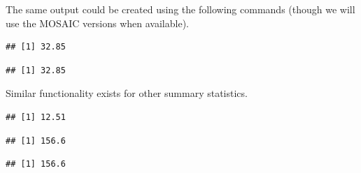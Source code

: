 %
%
The same output could be created using the following commands (though we will use the MOSAIC versions when available).
\begin{knitrout}
\color{fgcolor}\begin{kframe}
\begin{alltt}
 
\end{alltt}
\begin{verbatim}
## [1] 32.85
\end{verbatim}
\begin{alltt}
\hlopt{$}
\end{alltt}
\begin{verbatim}
## [1] 32.85
\end{verbatim}
\end{kframe}
\end{knitrout}
%
%
Similar functionality exists for other summary statistics.
\begin{knitrout}
\color{fgcolor}\begin{kframe}
\begin{alltt}
\hlstd{(}\hlopt{~}  
\end{alltt}
\begin{verbatim}
## [1] 12.51
\end{verbatim}
\end{kframe}
\end{knitrout}
\begin{knitrout}
\color{fgcolor}\begin{kframe}
\begin{alltt}
\hlstd{(}\hlopt{~}  \hlopt{^}
\end{alltt}
\begin{verbatim}
## [1] 156.6
\end{verbatim}
\begin{alltt}
\hlstd{(}\hlopt{~}  
\end{alltt}
\begin{verbatim}
## [1] 156.6
\end{verbatim}
\end{kframe}
\end{knitrout}

